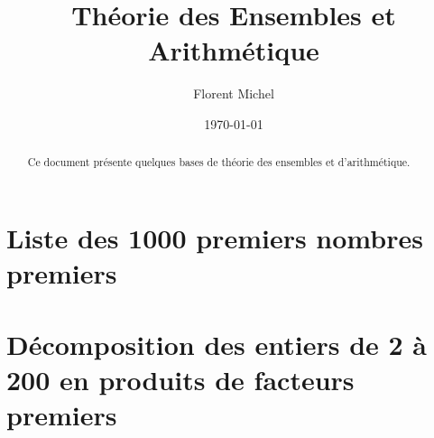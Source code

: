 
 
\title{Théorie des Ensembles et Arithmétique}
\date{\today}
\author{%
Florent Michel \\ 
\Fstar} 

 
\date{}
\maketitle 
\begin{abstract}
Ce document présente quelques bases de théorie des ensembles et d'arithmétique.
\end{abstract}
\bigskip
\begin{multicols}{2}
\renewcommand{\contentsname}{Table des matières}
\tableofcontents 
\end{multicols}

\clearpage



\clearpage



\clearpage

\appendix



\clearpage

\section{Liste des 1000 premiers nombres premiers} 

\noindent\textsf{}

\clearpage

\section{Décomposition des entiers de 2 à 200 en produits de facteurs premiers}

\begin{multicols}{4}

\end{multicols}

\bye
